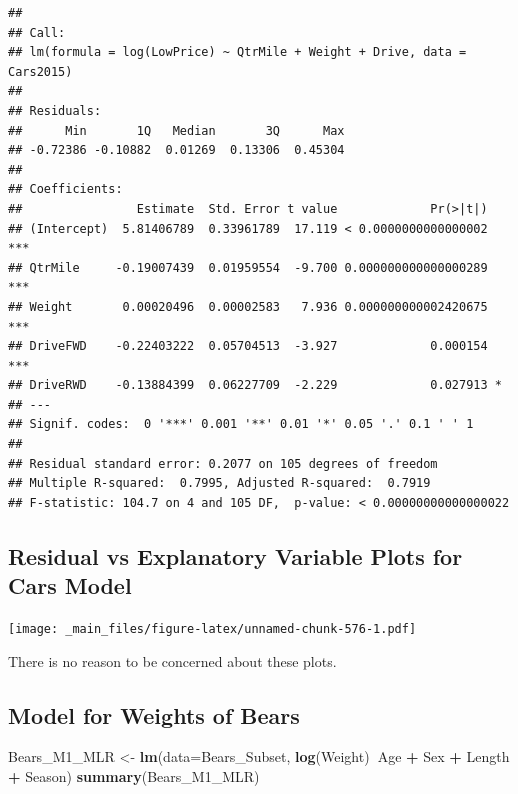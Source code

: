 \documentclass[]{book}
\newenvironment{Shaded}{\begin{snugshade}}{\end{snugshade}}
\newcommand{\KeywordTok}[1]{\textcolor[rgb]{0.13,0.29,0.53}{\textbf{#1}}}
\newcommand{\DataTypeTok}[1]{\textcolor[rgb]{0.13,0.29,0.53}{#1}}
\newcommand{\StringTok}[1]{\textcolor[rgb]{0.31,0.60,0.02}{#1}}
\newcommand{\OperatorTok}[1]{\textcolor[rgb]{0.81,0.36,0.00}{\textbf{#1}}}
\newcommand{\NormalTok}[1]{#1}
\begin{document}
\begin{verbatim}
## 
## Call:
## lm(formula = log(LowPrice) ~ QtrMile + Weight + Drive, data = Cars2015)
## 
## Residuals:
##      Min       1Q   Median       3Q      Max 
## -0.72386 -0.10882  0.01269  0.13306  0.45304 
## 
## Coefficients:
##                Estimate  Std. Error t value             Pr(>|t|)    
## (Intercept)  5.81406789  0.33961789  17.119 < 0.0000000000000002 ***
## QtrMile     -0.19007439  0.01959554  -9.700 0.000000000000000289 ***
## Weight       0.00020496  0.00002583   7.936 0.000000000002420675 ***
## DriveFWD    -0.22403222  0.05704513  -3.927             0.000154 ***
## DriveRWD    -0.13884399  0.06227709  -2.229             0.027913 *  
## ---
## Signif. codes:  0 '***' 0.001 '**' 0.01 '*' 0.05 '.' 0.1 ' ' 1
## 
## Residual standard error: 0.2077 on 105 degrees of freedom
## Multiple R-squared:  0.7995, Adjusted R-squared:  0.7919 
## F-statistic: 104.7 on 4 and 105 DF,  p-value: < 0.00000000000000022
\end{verbatim}

\subsection{Residual vs Explanatory Variable Plots for Cars
Model}\label{residual-vs-explanatory-variable-plots-for-cars-model}

\texttt{[image: \_main\_files/figure-latex/unnamed-chunk-576-1.pdf]}

There is no reason to be concerned about these plots.

\subsection{Model for Weights of
Bears}\label{model-for-weights-of-bears}

\begin{Shaded}
\begin{Highlighting}[]
\NormalTok{Bears_M1_MLR <-}\StringTok{ }\KeywordTok{lm}\NormalTok{(}\DataTypeTok{data=}\NormalTok{Bears_Subset, }\KeywordTok{log}\NormalTok{(Weight)}\OperatorTok{~}\NormalTok{Age }\OperatorTok{+}\StringTok{ }\NormalTok{Sex }\OperatorTok{+}\StringTok{ }\NormalTok{Length }\OperatorTok{+}\StringTok{ }\NormalTok{Season)}
\KeywordTok{summary}\NormalTok{(Bears_M1_MLR)}
\end{Highlighting}
\end{Shaded}
\end{document}
